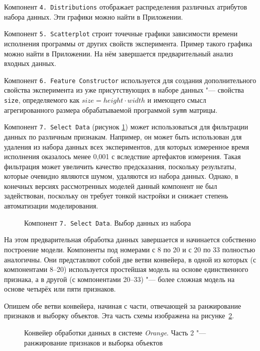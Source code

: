 Компонент \texttt{4.\,Distributions} отображает распределения различных атрибутов набора данных. Эти графики можно найти в Приложении.

Компонент \texttt{5.\,Scatterplot} строит точечные графики зависимости времени исполнения программы от других свойств эксперимента. Пример такого графика можно найти в Приложении. На нём завершается предварительный анализ входных данных.

Компонент \texttt{6.\,Feature Constructor} используется для создания дополнительного свойства эксперимента из уже присутствующих в наборе данных "--- свойства \texttt{size}, определяемого как $size = height \cdot width$ и имеющего смысл агрегированного размера обрабатываемой программой \texttt{symm} матрицы.

Компонент \texttt{7.\,Select~Data} (рисунок \ref{img:7-Select-Data}) может использоваться для фильтрации данных по различным признакам. Например, он может быть использован для удаления из набора данных всех экспериментов, для которых измеренное время исполнения оказалось менее 0,001 с вследствие артефактов измерения. Такая фильтрация может увеличить качество предсказания, поскольку результаты, которые очевидно являются шумом, удаляются из набора данных. Однако, в конечных версиях рассмотренных моделей данный компонент не был задействован, поскольку он требует тонкой настройки и снижает степень автоматизации моделирования.

\begin{figure}[tbp]
    \caption{Компонент \texttt{7.\,Select~Data}. Выбор данных из набора}
    \label{img:7-Select-Data}
\end{figure}

На этом предварительная обработка данных завершается и начинается собственно построение модели. Компоненты под номерами с 8 по 20 и с 20 по 33 полностью аналогичны. Они представляют собой две ветви конвейера, в одной из которых (с компонентами 8--20) используется простейшая модель на основе единственного признака, а в другой (с компонентами 20--33) "--- более сложная модель на основе четырёх или пяти признаков.

Опишем обе ветви конвейера, начиная с части, отвечающей за ранжирование признаков и выборку объектов. Эта часть схемы изображена на рисунке~\ref{img:series30-2}.

\begin{figure}[tbp]
    \caption{Конвейер обработки данных в системе \textit{Orange}. Часть 2 "--- ранжирование признаков и выборка объектов}
    \label{img:series30-2}
\end{figure}


